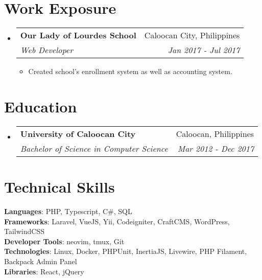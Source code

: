 \documentclass[letterpaper,11pt]{article}
\makeatletter
\newcommand{\resumeItem}[1]{
  \item\small{
    {#1 \vspace{-2pt}}
  }
}
\newcommand{\resumeSubheading}[4]{
  \vspace{-2pt}\item
    \begin{tabular*}{0.97\textwidth}[t]{l@{\extracolsep{\fill}}r}
      \textbf{#1} & #2 \\
      \textit{\small#3} & \textit{\small #4} \\
    \end{tabular*}\vspace{-7pt}
}
\newcommand{\resumeSubSubheading}[2]{
    \item
    \begin{tabular*}{0.97\textwidth}{l@{\extracolsep{\fill}}r}
      \textit{\small#1} & \textit{\small #2} \\
    \end{tabular*}\vspace{-7pt}
}
\newcommand{\resumeSubHeadingListStart}{\begin{itemize}[leftmargin=0.15in, label={}]}
\newcommand{\resumeSubHeadingListEnd}{\end{itemize}}
\newcommand{\resumeItemListStart}{\begin{itemize}}
\newcommand{\resumeItemListEnd}{\end{itemize}\vspace{-5pt}}
\makeatother
\begin{document}
\section{Work Exposure}
  \resumeSubHeadingListStart

    \resumeSubheading
      {Our Lady of Lourdes School}{Caloocan City, Philippines}
      {Web Developer}{Jan 2017 - Jul 2017}
      \resumeItemListStart
        \resumeItem{Created school's enrollment system as well as accounting system.}
      \resumeItemListEnd
  \resumeSubHeadingListEnd


      



\section{Education}
  \resumeSubHeadingListStart
    \resumeSubheading
      {University of Caloocan City}{Caloocan, Philippines}
      {Bachelor of Science in Computer Science}{Mar 2012 - Dec 2017}
  \resumeSubHeadingListEnd


\section{Technical Skills}

 \begin{itemize}[leftmargin=0.15in, label={}]

       \small{\item{

      \textbf{Languages}{: PHP, Typescript, C\#, SQL } \\

      \textbf{Frameworks}{: Laravel, VueJS, Yii, Codeigniter, CraftCMS, WordPress, TailwindCSS} \\

      \textbf{Developer Tools}{: neovim, tmux, Git } \\

      \textbf{Technologies}{: Linux, Docker, PHPUnit, InertiaJS, Livewire, PHP Filament, Backpack Admin Panel } \\

      \textbf{Libraries}{: React, jQuery}

                    }}
            \end{itemize}
\end{document}
